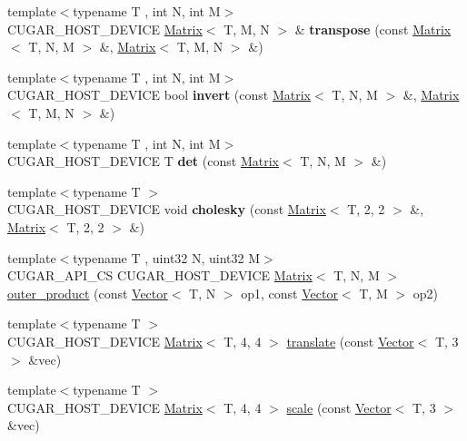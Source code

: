 \begin{DoxyCompactItemize}
\item 
{\footnotesize template$<$typename T , int N, int M$>$ }\\C\+U\+G\+A\+R\+\_\+\+H\+O\+S\+T\+\_\+\+D\+E\+V\+I\+CE \hyperlink{structcugar_1_1_matrix}{Matrix}$<$ T, M, N $>$ \& {\bfseries transpose} (const \hyperlink{structcugar_1_1_matrix}{Matrix}$<$ T, N, M $>$ \&, \hyperlink{structcugar_1_1_matrix}{Matrix}$<$ T, M, N $>$ \&)
\item 
{\footnotesize template$<$typename T , int N, int M$>$ }\\C\+U\+G\+A\+R\+\_\+\+H\+O\+S\+T\+\_\+\+D\+E\+V\+I\+CE bool {\bfseries invert} (const \hyperlink{structcugar_1_1_matrix}{Matrix}$<$ T, N, M $>$ \&, \hyperlink{structcugar_1_1_matrix}{Matrix}$<$ T, M, N $>$ \&)
\item 
{\footnotesize template$<$typename T , int N, int M$>$ }\\C\+U\+G\+A\+R\+\_\+\+H\+O\+S\+T\+\_\+\+D\+E\+V\+I\+CE T {\bfseries det} (const \hyperlink{structcugar_1_1_matrix}{Matrix}$<$ T, N, M $>$ \&)
\item 
{\footnotesize template$<$typename T $>$ }\\C\+U\+G\+A\+R\+\_\+\+H\+O\+S\+T\+\_\+\+D\+E\+V\+I\+CE void {\bfseries cholesky} (const \hyperlink{structcugar_1_1_matrix}{Matrix}$<$ T, 2, 2 $>$ \&, \hyperlink{structcugar_1_1_matrix}{Matrix}$<$ T, 2, 2 $>$ \&)
\item 
{\footnotesize template$<$typename T , uint32 N, uint32 M$>$ }\\C\+U\+G\+A\+R\+\_\+\+A\+P\+I\+\_\+\+CS C\+U\+G\+A\+R\+\_\+\+H\+O\+S\+T\+\_\+\+D\+E\+V\+I\+CE \hyperlink{structcugar_1_1_matrix}{Matrix}$<$ T, N, M $>$ \hyperlink{group___matrices_module_gaa66a675f08bbed306058f6074b21f57d}{outer\+\_\+product} (const \hyperlink{structcugar_1_1_vector}{Vector}$<$ T, N $>$ op1, const \hyperlink{structcugar_1_1_vector}{Vector}$<$ T, M $>$ op2)
\item 
{\footnotesize template$<$typename T $>$ }\\C\+U\+G\+A\+R\+\_\+\+H\+O\+S\+T\+\_\+\+D\+E\+V\+I\+CE \hyperlink{structcugar_1_1_matrix}{Matrix}$<$ T, 4, 4 $>$ \hyperlink{group___matrices_module_ga85a3c0cf9bdf6ef3fc3f957499b875e1}{translate} (const \hyperlink{structcugar_1_1_vector}{Vector}$<$ T, 3 $>$ \&vec)
\item 
{\footnotesize template$<$typename T $>$ }\\C\+U\+G\+A\+R\+\_\+\+H\+O\+S\+T\+\_\+\+D\+E\+V\+I\+CE \hyperlink{structcugar_1_1_matrix}{Matrix}$<$ T, 4, 4 $>$ \hyperlink{group___matrices_module_ga44968c79fbae587c1dfff598307b623e}{scale} (const \hyperlink{structcugar_1_1_vector}{Vector}$<$ T, 3 $>$ \&vec)

\end{DoxyCompactItemize}
